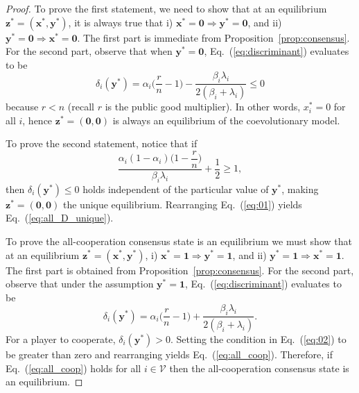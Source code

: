 \documentclass[letterpaper, 10 pt, conference]{ieeeconf}  %
\newcommand{\vect}[1]{\boldsymbol{#1}}
\renewcommand{\eqref}[1]{Eq.~(\ref{#1})}  %
\begin{document}
\begin{proof}
    To prove the first statement, we need to show that at an equilibrium $\vect z^* = (\vect x^*,\vect y^*)$, it is always true that i) $\vect x^* = \vect 0 \Rightarrow \vect y^* = \vect 0$, and ii) $\vect y^* = \vect 0 \Rightarrow \vect x^* = \vect 0$. The first part is immediate from Proposition~\ref{prop:consensus}. For the second part, observe that when $\vect y^* = \vect 0$, \eqref{eq:discriminant} evaluates to be
    \begin{equation}
        \delta_i(\vect y^*) = \alpha_i\bigg(\frac{r}{n}-1\bigg) - \frac{\beta_i\lambda_i}{2(\beta_i+\lambda_i)} \leq 0
    \end{equation}  
    because $r<n$ (recall $r$ is the public good multiplier). In other words, $x_i^* = 0$ for all $i$, hence $\vect z^* = (\vect 0,\vect 0)$ is always an equilibrium of the coevolutionary model.

    To prove the second statement, notice that if
    \begin{equation}\label{eq:01}
        \dfrac{\alpha_i(1-\alpha_i)\Big(1-\dfrac{r}{n}\Big)}{\beta_i\lambda_i}+\frac{1}{2} \geq1,
    \end{equation}
    then $\delta_i(\vect y^*) \leq 0$ holds independent of the particular value of $\vect y^*$, making $\vect z^*=(\vect 0,\vect 0)$ the unique equilibrium. Rearranging \eqref{eq:01} yields \eqref{eq:all_D_unique}. 

    To prove the all-cooperation consensus state is an equilibrium we must show that at an equilibrium $\vect z^* = (\vect x^*,\vect y^*)$, i) $\vect x^* = \vect 1 \Rightarrow \vect y^* = \vect 1$, and ii) $\vect y^* = \vect 1 \Rightarrow \vect x^* = \vect 1$. The first part is obtained from Proposition~\ref{prop:consensus}. For the second part, observe that under the assumption $\vect y^* = \vect 1$, \eqref{eq:discriminant} evaluates to be
    \begin{equation}\label{eq:02}
        \delta_i(\vect y^*) = \alpha_i\bigg(\frac{r}{n}-1\bigg) + \frac{\beta_i\lambda_i}{2(\beta_i+\lambda_i)}.
    \end{equation} 
    For a player to cooperate, $\delta_i(\vect y^*)>0$. Setting the condition in \eqref{eq:02} to be greater than zero and rearranging yields \eqref{eq:all_coop}. Therefore, if \eqref{eq:all_coop} holds for all $i \in \mathcal{V}$ then the all-cooperation consensus state is an equilibrium. %
\end{proof}
\end{document}
